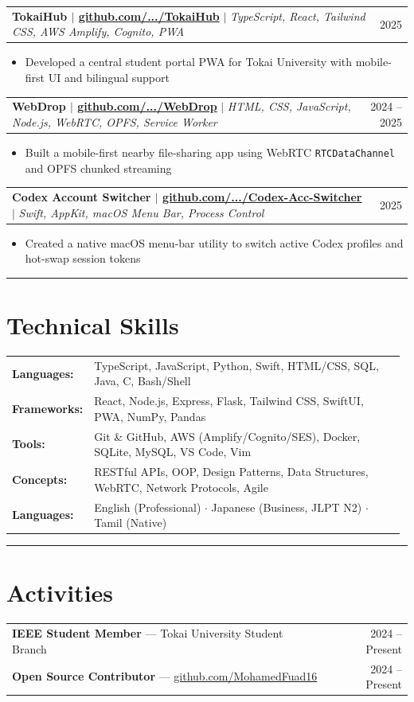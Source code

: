 \documentclass[9.5pt, a4paper]{article}
\makeatletter
\newcommand{\accentrule}{{\color{teal}\rule{\linewidth}{0.6pt}}}
\newcommand{\projentry}[3]{%
  \vspace{1.5pt}
  \begin{tabularx}{\linewidth}{@{}Xr@{}}
    \textbf{\color{darkcharcoal}#1} \textcolor{midgray}{\small $|$ \textit{#2}} & \textcolor{midgray}{\small #3}\\
  \end{tabularx}
  \vspace{-1.5pt}
}
\newenvironment{cvbullets}{%
  \begin{itemize}[leftmargin=1.1em, itemsep=0.2pt, topsep=0.5pt, parsep=0pt]
  \small\color{darkcharcoal}
}{%
  \end{itemize}\vspace{1pt}
}
\newcommand{\skill}[2]{\textbf{\color{teal}#1:} & \small\color{darkcharcoal}#2 \\[2pt]}
\makeatother
\begin{document}
\projentry{TokaiHub $|$ \small\color{midgray}\href{https://github.com/MohamedFuad16/TokaiHub}{github.com/.../TokaiHub}}{TypeScript, React, Tailwind CSS, AWS Amplify, Cognito, PWA}{2025}
\begin{cvbullets}
  \item Developed a central student portal PWA for Tokai University with mobile-first UI and bilingual support
\end{cvbullets}

\projentry{WebDrop $|$ \small\color{midgray}\href{https://github.com/MohamedFuad16/WebDrop}{github.com/.../WebDrop}}{HTML, CSS, JavaScript, Node.js, WebRTC, OPFS, Service Worker}{2024 -- 2025}
\begin{cvbullets}
  \item Built a mobile-first nearby file-sharing app using WebRTC \texttt{RTCDataChannel} and OPFS chunked streaming
\end{cvbullets}

\projentry{Codex Account Switcher $|$ \small\color{midgray}\href{https://github.com/MohamedFuad16/Codex-Acc-Switcher}{github.com/.../Codex-Acc-Switcher}}{Swift, AppKit, macOS Menu Bar, Process Control}{2025}
\begin{cvbullets}
  \item Created a native macOS menu-bar utility to switch active Codex profiles and hot-swap session tokens
\end{cvbullets}

\accentrule

\section{Technical Skills}

\begin{tabular}{@{}p{0.18\linewidth}p{0.80\linewidth}@{}}
  \skill{Languages}{TypeScript, JavaScript, Python, Swift, HTML/CSS, SQL, Java, C, Bash/Shell}
  \skill{Frameworks}{React, Node.js, Express, Flask, Tailwind CSS, SwiftUI, PWA, NumPy, Pandas}
  \skill{Tools}{Git \& GitHub, AWS (Amplify/Cognito/SES), Docker, SQLite, MySQL, VS Code, Vim}
  \skill{Concepts}{RESTful APIs, OOP, Design Patterns, Data Structures, WebRTC, Network Protocols, Agile}
  \skill{Languages}{English (Professional) $\cdot$ Japanese (Business, JLPT N2) $\cdot$ Tamil (Native)}
\end{tabular}

\accentrule

\section{Activities}

\begin{tabularx}{\linewidth}{@{}Xr@{}}
  \textbf{\color{darkcharcoal}IEEE Student Member} --- Tokai University Student Branch & \textcolor{midgray}{\small 2024 -- Present}\\
  \textbf{\color{darkcharcoal}Open Source Contributor} --- \href{https://github.com/MohamedFuad16}{\color{teal}github.com/MohamedFuad16} & \textcolor{midgray}{\small 2024 -- Present}\\
\end{tabularx}
\end{document}

